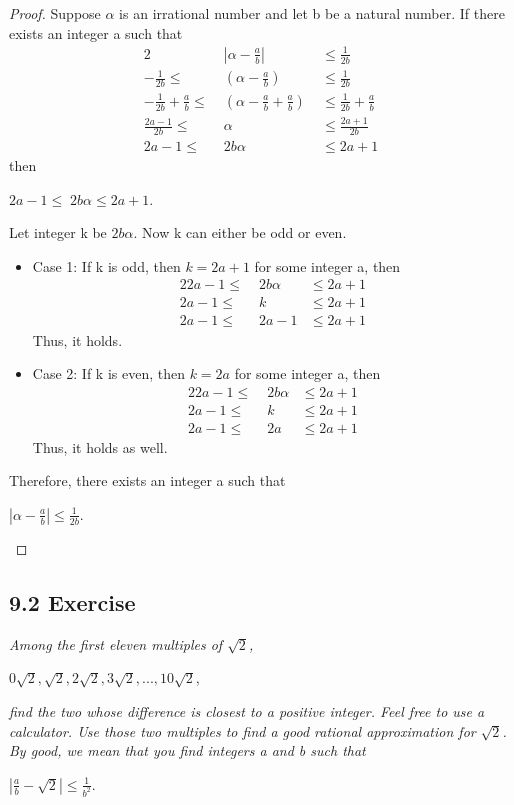 \documentclass{article}
\begin{document}
\begin{proof}
Suppose $\alpha$ is an irrational number and let b be a natural number. If there exists an integer a such that
\begin{alignat*}{2}
    \; &|\alpha - \frac{a}{b}| &\leq \frac{1}{2b}\\
    -\frac{1}{2b} \leq \;& (\alpha - \frac{a}{b}) &\leq \frac{1}{2b}\\
    -\frac{1}{2b} + \frac{a}{b} \leq \;& (\alpha - \frac{a}{b} + \frac{a}{b}) \;&\leq \frac{1}{2b} + \frac{a}{b}\\
    \frac{2a-1}{2b} \leq \;& \alpha \; &\leq \frac{2a+1}{2b}\\
    2a-1 \leq \;& 2b\alpha &\leq 2a+1
\end{alignat*}
then
\begin{center}
    $2a-1 \leq \; 2b\alpha \leq 2a+1$.
\end{center}
Let integer k be $2b\alpha$. Now k can either be odd or even.
\begin{itemize}
    \item Case 1: If k is odd, then $k = 2a+1$ for some integer a, then
    \begin{alignat*}{2}
        2a-1 \leq \;& 2b\alpha &\leq 2a+1\\
        2a-1 \leq \;& k &\leq 2a+1\\
        2a-1 \leq \;& 2a-1 &\leq 2a+1
    \end{alignat*}
    Thus, it holds.
    \item Case 2: If k is even, then $k = 2a$ for some integer a, then
    \begin{alignat*}{2}
        2a-1 \leq \;& 2b\alpha &\leq 2a+1\\
        2a-1 \leq \;& k &\leq 2a+1\\
        2a-1 \leq \;& 2a &\leq 2a+1
    \end{alignat*}
    Thus, it holds as well.
\end{itemize}
Therefore, there exists an integer a such that
\begin{center}
    $|\alpha - \frac{a}{b}| \leq \frac{1}{2b}$.
\end{center}
\end{proof}

\subsection*{9.2 Exercise} 
\quad \textit{Among the first eleven multiples of $\sqrt{2}$,}
\begin{center}
    $0\sqrt{2},\sqrt{2},2\sqrt{2},3\sqrt{2},...,10\sqrt{2}$,
\end{center}
\textit{find the two whose difference is closest to a positive integer. Feel free to use a calculator. Use those two multiples to find a good rational approximation for $\sqrt{2}$. By good, we mean that you find integers a and b such that}
\begin{center}
    $|\frac{a}{b} - \sqrt{2}| \leq \frac{1}{b^{2}}$.
\end{center}
\end{document}
